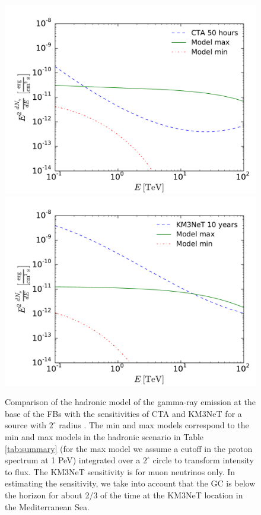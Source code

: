 \begin{figure}[h]
\centering
 \includegraphics[width=\twopic\textwidth]{plots/low_lat_FB_CTA.pdf}
 \includegraphics[width=\twopic\textwidth]{plots/low_lat_FB_KM3.pdf}
 \caption{Comparison of the hadronic model of the gamma-ray emission at the base of the FBs
 with the sensitivities of CTA and KM3NeT for a source with $2^\circ$ radius \citep{2018APh...100...69A}.
 The min and max models correspond to the min and max models in
 the hadronic scenario in Table \ref{tab:summary} (for the max model we assume a cutoff in the proton spectrum at 1 PeV)
 integrated over a $2^\circ$ circle to transform intensity to flux.
 The KM3NeT sensitivity is for muon neutrinos only.
 In estimating the sensitivity, we take into account that the GC is below the horizon for about 2/3 of the time
 at the KM3NeT location in the Mediterranean Sea.
 }
 \label{fig:sensitivities}
\end{figure}


